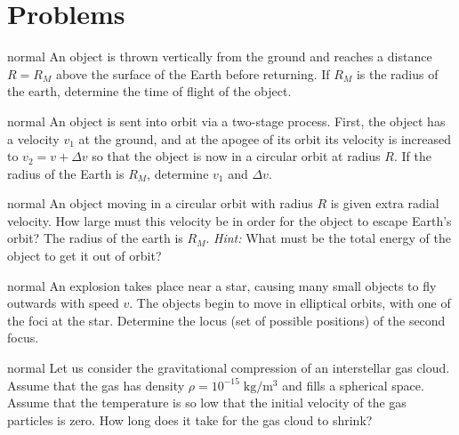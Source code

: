 \documentclass[11pt]{article}
\begin{document}
\section{Problems}
\vspace{-5mm}
\hypertarget{P5}{}
\begin{solution}{normal}
An object is thrown vertically from the ground and reaches a distance $R=R_M$ above the surface of the Earth before returning. If $R_M$ is the radius of the earth, determine the time of flight of the object.
\end{solution}
\hypertarget{P6}{}
\begin{solution}{normal}
An object is sent into orbit via a two-stage process. First, the object has a velocity $v_1$ at the ground, and at the apogee of its orbit its velocity is increased to $v_2=v+\Delta v$ so that the object is now in a circular orbit at radius $R$. If the radius of the Earth is $R_M$, determine $v_1$ and $\Delta v$.
\end{solution}
\hypertarget{P7}{}
\begin{solution}{normal}
An object moving in a circular orbit with radius $R$ is given extra radial velocity. How large must this velocity be in order for the object to escape Earth's orbit? The radius of the earth is $R_M$. \textit{Hint:} What must be the total energy of the object to get it out of orbit?
\end{solution}
\hypertarget{P8}{}
\begin{solution}{normal}
An explosion takes place near a star, causing many small objects to fly outwards with speed $v$. The objects begin to move in elliptical orbits, with one of the foci at the star. Determine the locus (set of possible positions) of the second focus.
\end{solution}
\hypertarget{P9}{}
\begin{solution}{normal}
Let us consider the gravitational compression of an interstellar gas cloud. Assume that the gas has density $\rho=10^{-15}\;\text{kg}/\text{m}^3$ and fills a spherical space. Assume that the temperature is so low that the initial velocity of the gas particles is zero. How long does it take for the gas cloud to shrink?
\end{solution}
\hypertarget{P10}{}
\end{document}
